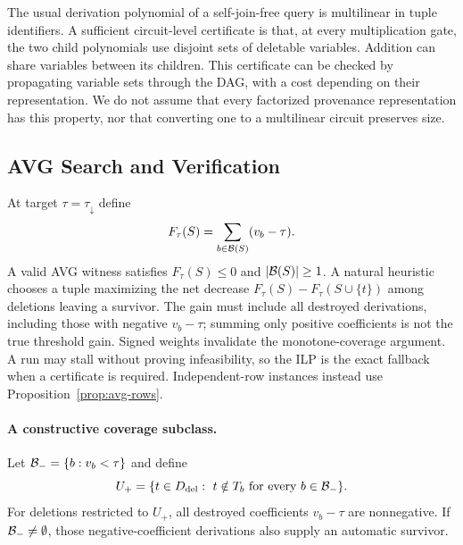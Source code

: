 The usual derivation polynomial of a self-join-free query is multilinear
in tuple identifiers. A sufficient circuit-level certificate is that, at
every multiplication gate, the two child polynomials use disjoint sets of
deletable variables. Addition can share variables between its children.
This certificate can be checked by propagating variable sets through the
DAG, with a cost depending on their representation. We do not assume
that every factorized provenance representation has this property, nor
that converting one to a multilinear circuit preserves size.

\subsection{AVG Search and Verification}
\label{sec:avg-search}

At target $\tau=\tau_{\downarrow}$ define
\[
F_\tau(S)=\sum_{b\in\mathcal{B}(S)}(v_b-\tau).
\]
A valid AVG witness satisfies $F_\tau(S)\le0$ and $|\mathcal{B}(S)|\ge1$.
A natural heuristic chooses a tuple maximizing the net decrease
$F_\tau(S)-F_\tau(S\cup\{t\})$ among deletions leaving a survivor.
The gain must include all destroyed derivations, including those with
negative $v_b-\tau$; summing only positive coefficients is not the true
threshold gain. Signed weights invalidate the monotone-coverage argument.
A run may stall without proving infeasibility, so the ILP is the exact
fallback when a certificate is required. Independent-row instances instead
use Proposition~\ref{prop:avg-rows}.

\paragraph{A constructive coverage subclass.}
Let $\mathcal{B}_- =\{b:v_b<\tau\}$ and define
\[
U_+=\{t\in D_{\mathrm{del}}:\ t\notin T_b\text{ for every }b\in\mathcal{B}_-\}.
\]
For deletions restricted to $U_+$, all destroyed coefficients $v_b-\tau$
are nonnegative. If $\mathcal{B}_-\ne\emptyset$, those negative-coefficient
derivations also supply an automatic survivor.

